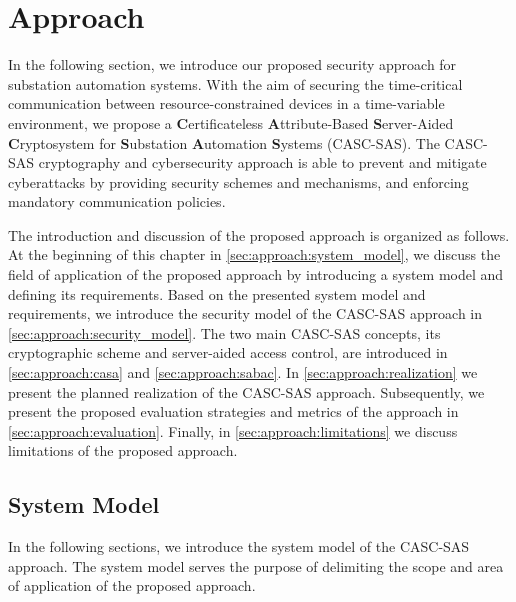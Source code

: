 \chapter{Approach}
\label{ch:approach}
In the following section, we introduce our proposed security approach for substation automation systems.
With the aim of securing the time-critical communication between resource-constrained devices in a time-variable environment, we propose a \textbf{C}ertificateless \textbf{A}ttribute-Based \textbf{S}erver-Aided \textbf{C}ryptosystem for \textbf{S}ubstation \textbf{A}utomation \textbf{S}ystems (CASC-SAS).
The CASC-SAS cryptography and cybersecurity approach is able to prevent and mitigate cyberattacks by providing security schemes and mechanisms, and enforcing mandatory communication policies.

The introduction and discussion of the proposed approach is organized as follows.
At the beginning of this chapter in \autoref{sec:approach:system_model}, we discuss the field of application of the proposed approach by introducing a system model and defining its requirements.
Based on the presented system model and requirements, we introduce the security model of the CASC-SAS approach in \autoref{sec:approach:security_model}.
The two main CASC-SAS concepts, its cryptographic scheme and server-aided access control, are introduced in \autoref{sec:approach:casa} and \autoref{sec:approach:sabac}.
In \autoref{sec:approach:realization} we present the planned realization of the CASC-SAS approach.
Subsequently, we present the proposed evaluation strategies and metrics of the approach in \autoref{sec:approach:evaluation}.
Finally, in \autoref{sec:approach:limitations} we discuss limitations of the proposed approach.

\section{System Model}
\label{sec:approach:system_model}
In the following sections, we introduce the system model of the CASC-SAS approach.
The system model serves the purpose of delimiting the scope and area of application of the proposed approach.

